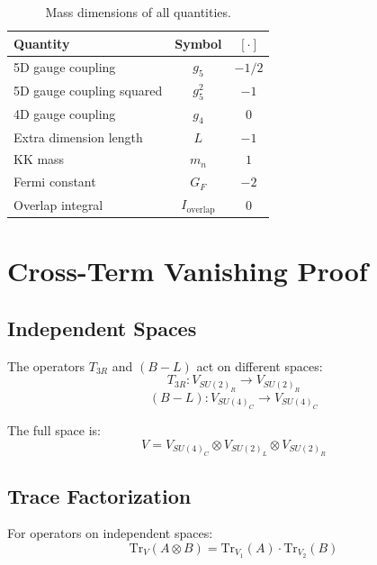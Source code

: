 \documentclass[11pt,a4paper]{article}
\begin{document}
\begin{table}[ht]
\centering
\caption{Mass dimensions of all quantities.}
\label{tab:dim-table}
\begin{tabular}{lcc}
\toprule
Quantity & Symbol & $[\cdot]$ \\
\midrule
5D gauge coupling & $g_5$ & $-1/2$ \\
5D gauge coupling squared & $g_5^2$ & $-1$ \\
4D gauge coupling & $g_4$ & $0$ \\
Extra dimension length & $L$ & $-1$ \\
KK mass & $m_n$ & $1$ \\
Fermi constant & $G_F$ & $-2$ \\
Overlap integral & $I_{\text{overlap}}$ & $0$ \\
\bottomrule
\end{tabular}
\end{table}

\section{Cross-Term Vanishing Proof}
\label{app:cross-term}

\subsection{Independent Spaces}
\label{app:independent-spaces}

The operators $T_{3R}$ and $(B-L)$ act on different spaces:
\begin{equation}
\label{eq:t3r-space}
T_{3R}: V_{SU(2)_R} \to V_{SU(2)_R}
\end{equation}
\begin{equation}
\label{eq:bl-space}
(B-L): V_{SU(4)_C} \to V_{SU(4)_C}
\end{equation}

The full space is:
\begin{equation}
\label{eq:full-space}
V = V_{SU(4)_C} \otimes V_{SU(2)_L} \otimes V_{SU(2)_R}
\end{equation}

\subsection{Trace Factorization}
\label{app:trace-factor}

For operators on independent spaces:
\begin{equation}
\label{eq:trace-product}
\mathrm{Tr}_V(A \otimes B) = \mathrm{Tr}_{V_1}(A) \cdot \mathrm{Tr}_{V_2}(B)
\end{equation}
\end{document}
